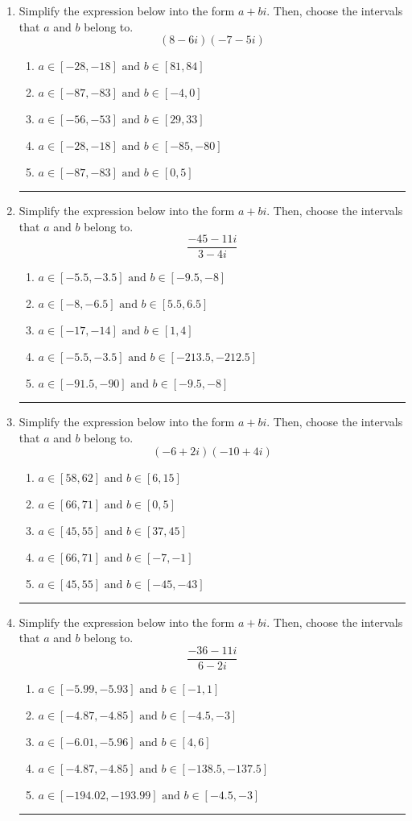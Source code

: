 \documentclass[14pt]{extbook}
\newcommand{\litem}[1]{\item#1\hspace*{-1cm}\rule{\textwidth}{0.4pt}}
\begin{document}
\begin{enumerate}
{\begin{enumerate}[label=\Alph*.]
\end{enumerate} }
\litem{
Simplify the expression below into the form $a+bi$. Then, choose the intervals that $a$ and $b$ belong to.\[ (8 - 6 i)(-7 - 5 i) \]\begin{enumerate}[label=\Alph*.]
\item \( a \in [-28, -18] \text{ and } b \in [81, 84] \)
\item \( a \in [-87, -83] \text{ and } b \in [-4, 0] \)
\item \( a \in [-56, -53] \text{ and } b \in [29, 33] \)
\item \( a \in [-28, -18] \text{ and } b \in [-85, -80] \)
\item \( a \in [-87, -83] \text{ and } b \in [0, 5] \)

\end{enumerate} }
\litem{
Simplify the expression below into the form $a+bi$. Then, choose the intervals that $a$ and $b$ belong to.\[ \frac{-45 - 11 i}{3 - 4 i} \]\begin{enumerate}[label=\Alph*.]
\item \( a \in [-5.5, -3.5] \text{ and } b \in [-9.5, -8] \)
\item \( a \in [-8, -6.5] \text{ and } b \in [5.5, 6.5] \)
\item \( a \in [-17, -14] \text{ and } b \in [1, 4] \)
\item \( a \in [-5.5, -3.5] \text{ and } b \in [-213.5, -212.5] \)
\item \( a \in [-91.5, -90] \text{ and } b \in [-9.5, -8] \)

\end{enumerate} }
\litem{
Simplify the expression below into the form $a+bi$. Then, choose the intervals that $a$ and $b$ belong to.\[ (-6 + 2 i)(-10 + 4 i) \]\begin{enumerate}[label=\Alph*.]
\item \( a \in [58, 62] \text{ and } b \in [6, 15] \)
\item \( a \in [66, 71] \text{ and } b \in [0, 5] \)
\item \( a \in [45, 55] \text{ and } b \in [37, 45] \)
\item \( a \in [66, 71] \text{ and } b \in [-7, -1] \)
\item \( a \in [45, 55] \text{ and } b \in [-45, -43] \)

\end{enumerate} }
\litem{
Simplify the expression below into the form $a+bi$. Then, choose the intervals that $a$ and $b$ belong to.\[ \frac{-36 - 11 i}{6 - 2 i} \]\begin{enumerate}[label=\Alph*.]
\item \( a \in [-5.99, -5.93] \text{ and } b \in [-1, 1] \)
\item \( a \in [-4.87, -4.85] \text{ and } b \in [-4.5, -3] \)
\item \( a \in [-6.01, -5.96] \text{ and } b \in [4, 6] \)
\item \( a \in [-4.87, -4.85] \text{ and } b \in [-138.5, -137.5] \)
\item \( a \in [-194.02, -193.99] \text{ and } b \in [-4.5, -3] \)


\end{enumerate}}
\end{enumerate}
\end{document}
